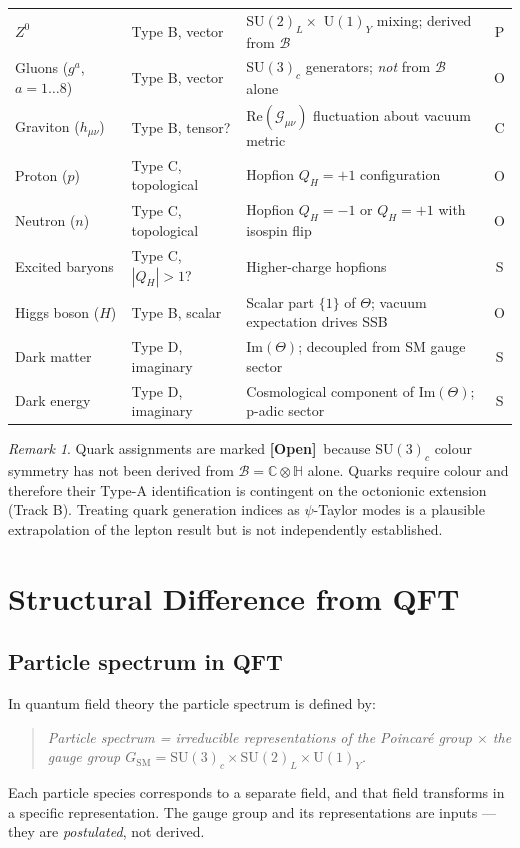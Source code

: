 \documentclass[12pt,a4paper]{article}
\theoremstyle{remark}
\newtheorem{remark}[theorem]{Remark}
\newcommand{\B}{\mathcal{B}}
\newcommand{\C}{\mathbb{C}}
\newcommand{\H}{\mathbb{H}}
\newcommand{\re}{\mathrm{Re}}
\newcommand{\im}{\mathrm{Im}}
\newcommand{\openq}{\textbf{[Open]}}
\begin{document}
\begin{table}[htbp]
\begin{tabular}{>{\raggedright}p{3.2cm}
                >{\raggedright}p{2.8cm}
                >{\raggedright}p{4.8cm}
                c}
$Z^0$
  & Type B, vector
  & SU$(2)_L \times$ U$(1)_Y$ mixing; derived from $\B$
  & P \\
Gluons ($g^a$, $a=1\ldots 8$)
  & Type B, vector
  & SU$(3)_c$ generators; \emph{not} from $\B$ alone
  & O \\
Graviton ($h_{\mu\nu}$)
  & Type B, tensor?
  & $\re(\mathcal{G}_{\mu\nu})$ fluctuation about vacuum metric
  & C \\
Proton ($p$)
  & Type C, topological
  & Hopfion $Q_H=+1$ configuration
  & O \\
Neutron ($n$)
  & Type C, topological
  & Hopfion $Q_H=-1$ or $Q_H=+1$ with isospin flip
  & O \\
Excited baryons
  & Type C, $|Q_H|>1$?
  & Higher-charge hopfions
  & S \\
Higgs boson ($H$)
  & Type B, scalar
  & Scalar part $\{1\}$ of $\Theta$; vacuum expectation drives SSB
  & O \\
Dark matter
  & Type D, imaginary
  & $\im(\Theta)$; decoupled from SM gauge sector
  & S \\
Dark energy
  & Type D, imaginary
  & Cosmological component of $\im(\Theta)$; p-adic sector
  & S \\
\bottomrule
\end{tabular}
\end{table}

\begin{remark}
Quark assignments are marked \openq\ because $\mathrm{SU}(3)_c$ colour
symmetry has not been derived from $\B = \C\otimes\H$ alone.  Quarks require
colour and therefore their Type-A identification is contingent on the
octonionic extension (Track B).  Treating quark generation indices as
$\psi$-Taylor modes is a plausible extrapolation of the lepton result but is
not independently established.
\end{remark}

\section{Structural Difference from QFT}
\label{sec:qft}

\subsection{Particle spectrum in QFT}

In quantum field theory the particle spectrum is defined by:
\begin{quote}
\emph{Particle spectrum = irreducible representations of the Poincaré group
$\times$ the gauge group $G_{\mathrm{SM}} = \mathrm{SU}(3)_c\times
\mathrm{SU}(2)_L\times\mathrm{U}(1)_Y$.}
\end{quote}
Each particle species corresponds to a separate field, and that field
transforms in a specific representation.  The gauge group and its
representations are inputs — they are \emph{postulated}, not derived.
\end{document}
